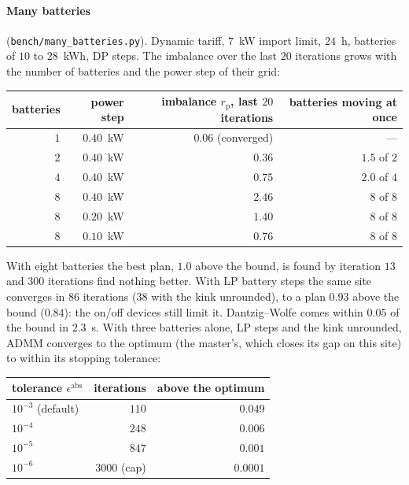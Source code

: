 \documentclass[11pt,a4paper]{article}
\begin{document}
\paragraph{Many batteries} (\texttt{bench/many\_batteries.py}). Dynamic tariff,
$7$~kW import limit, $24$~h, batteries of $10$ to $28$~kWh, DP steps. The
imbalance over the last $20$ iterations grows with the number of batteries and
the power step of their grid:
\begin{center}
\small
\begin{tabular}{rrrr}
\toprule
batteries & power step & imbalance $r_{\mathrm p}$, last $20$ iterations & batteries moving at once \\
\midrule
$1$ & $0.40$~kW & $0.06$ (converged) & --- \\
$2$ & $0.40$~kW & $0.36$ & $1.5$ of $2$ \\
$4$ & $0.40$~kW & $0.75$ & $2.0$ of $4$ \\
$8$ & $0.40$~kW & $2.46$ & $8$ of $8$ \\
$8$ & $0.20$~kW & $1.40$ & $8$ of $8$ \\
$8$ & $0.10$~kW & $0.76$ & $8$ of $8$ \\
\bottomrule
\end{tabular}
\end{center}
With eight batteries the best plan, $1.0$ above the bound, is found by iteration
$13$ and $300$ iterations find nothing better. With LP battery steps the same site
converges in $86$ iterations ($38$ with the kink unrounded), to a plan $0.93$ above
the bound ($0.84$): the on/off devices still limit it. Dantzig--Wolfe comes within
$0.05$ of the bound in $2.3$~s. With three batteries alone, LP steps and the kink
unrounded, ADMM converges to the optimum (the master's, which closes its gap on
this site) to within its stopping tolerance:
\begin{center}
\small
\begin{tabular}{lrr}
\toprule
tolerance $\epsilon^{\mathrm{abs}}$ & iterations & above the optimum \\
\midrule
$10^{-3}$ (default) & $110$ & $0.049$ \\
$10^{-4}$ & $248$ & $0.006$ \\
$10^{-5}$ & $847$ & $0.001$ \\
$10^{-6}$ & $3000$ (cap) & $0.0001$ \\
\bottomrule
\end{tabular}
\end{center}
\end{document}
